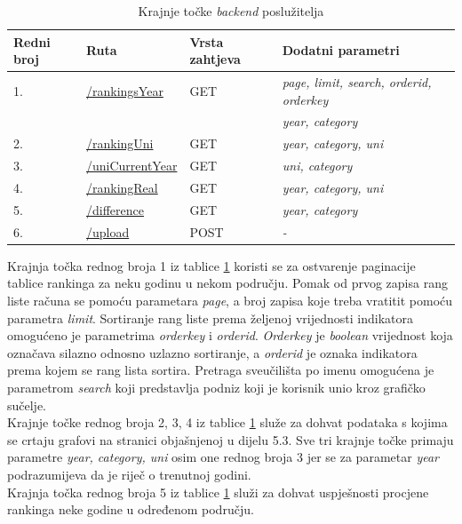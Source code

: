 \documentclass[times, utf8, zavrsni]{fer}
\begin{document}
\begin{table}[htb]
    \caption{Krajnje točke \emph{backend} poslužitelja}
        \label{tbl:endpoints}
        \centering
        \begin{tabular}{llll} \hline
        Redni broj & Ruta & Vrsta zahtjeva & Dodatni parametri\\ \hline
        1. & \url{/rankingsYear} & GET & \emph{page, limit, search, orderid, orderkey} \\
        &&&\emph{year, category}
        \\2. & \url{/rankingUni} & GET & \emph{year, category, uni}
        \\3. & \url{/uniCurrentYear} & GET & \emph{uni, category}
        \\4. & \url{/rankingReal} & GET & \emph{year, category, uni}
        \\5. & \url{/difference} & GET & \emph{ year, category}
        \\6. & \url{/upload} & POST & \emph{-}
        \end{tabular}
        \end{table} 
        \FloatBarrier
Krajnja točka rednog broja 1 iz tablice \ref{tbl:endpoints} koristi se za ostvarenje paginacije tablice rankinga za neku godinu u nekom području.
Pomak od prvog zapisa rang liste računa se pomoću parametara \emph{page}, a broj zapisa koje treba vratitit pomoću parametra \emph{limit}.
Sortiranje rang liste prema željenoj vrijednosti indikatora omogućeno je parametrima \emph{orderkey} i \emph{orderid}.
\emph{Orderkey} je \emph{boolean} vrijednost koja označava silazno odnosno uzlazno sortiranje, a \emph{orderid} je oznaka indikatora
prema kojem se rang lista sortira. Pretraga sveučilišta po imenu omogućena je parametrom \emph{search} koji predstavlja podniz koji je korisnik unio 
kroz grafičko sučelje.
\\

Krajnje točke rednog broja 2, 3, 4 iz tablice \ref{tbl:endpoints} služe za dohvat podataka s kojima se crtaju grafovi na stranici objašnjenoj u 
dijelu 5.3. Sve tri krajnje točke primaju parametre \emph{year, category, uni} osim one rednog broja 3 jer se za parametar \emph{year} podrazumijeva 
da je riječ o trenutnoj godini.
\\

Krajnja točka rednog broja 5 iz tablice \ref{tbl:endpoints} služi za dohvat uspješnosti procjene rankinga neke godine u određenom području.
\\
\end{document}
